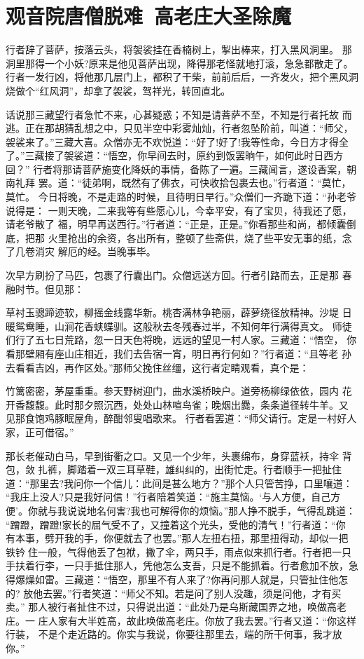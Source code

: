 \chapter{观音院唐僧脱难~高老庄大圣除魔}

行者辞了菩萨，按落云头，将袈裟挂在香楠树上，掣出棒来，打入黑风洞里。
那洞里那得一个小妖?原来是他见菩萨出现，降得那老怪就地打滚，急急都散走了。
行者一发行凶，将他那几层门上，都积了干柴，前前后后，一齐发火，把个黑风洞
烧做个“红风洞”，却拿了袈裟，驾祥光，转回直北。

话说那三藏望行者急忙不来，心甚疑惑；不知是请菩萨不至，不知是行者托故
而逃。正在那胡猜乱想之中，只见半空中彩雾灿灿，行者忽坠阶前，叫道：“师父，
袈裟来了。”三藏大喜。众僧亦无不欢悦道：“好了!好了!我等性命，今日方才得全
了。”三藏接了袈裟道：“悟空，你早间去时，原约到饭罢晌午，如何此时日西方回？”
行者将那请菩萨施变化降妖的事情，备陈了一遍。三藏闻言，遂设香案，朝南礼拜
罢。道：“徒弟啊，既然有了佛衣，可快收拾包裹去也。”行者道：“莫忙，莫忙。
今日将晚，不是走路的时候，且待明日早行。”众僧们一齐跪下道：“孙老爷说得是：
一则天晚，二来我等有些愿心儿，今幸平安，有了宝贝，待我还了愿，请老爷散了
福，明早再送西行。”行者道：“正是，正是。”你看那些和尚，都倾囊倒底，把那
火里抢出的余资，各出所有，整顿了些斋供，烧了些平安无事的纸，念了几卷消灾
解厄的经。当晚事毕。

次早方刷扮了马匹，包裹了行囊出门。众僧远送方回。行者引路而去，正是那
春融时节。但见那：

草衬玉骢蹄迹软，柳摇金线露华新。桃杏满林争艳丽，薜萝绕径放精神。沙堤
日暖鸳鸯睡，山涧花香蛱蝶驯。这般秋去冬残春过半，不知何年行满得真文。
师徒们行了五七日荒路，忽一日天色将晚，远远的望见一村人家。三藏道：“悟空，
你看那壁厢有座山庄相近，我们去告宿一宵，明日再行何如？”行者道：“且等老
孙去看看吉凶，再作区处。”那师父挽住丝缰，这行者定睛观看，真个是：

竹篱密密，茅屋重重。参天野树迎门，曲水溪桥映户。道旁杨柳绿依依，园内
花开香馥馥。此时那夕照沉西，处处山林喧鸟雀；晚烟出爨，条条道径转牛羊。又
见那食饱鸡豚眠屋角，醉酣邻叟唱歌来。
行者看罢道：“师父请行。定是一村好人家，正可借宿。”

那长老催动白马，早到街衢之口。又见一个少年，头裹绵布，身穿蓝袄，持伞
背包，敛扎裤，脚踏着一双三耳草鞋，雄纠纠的，出街忙走。行者顺手一把扯住
道：“那里去?我问你一个信儿：此间是甚么地方？”那个人只管苦挣，口里嚷道：
“我庄上没人?只是我好问信！”行者陪着笑道：“施主莫恼。‘与人方便，自己方
便’。你就与我说说地名何害?我也可解得你的烦恼。”那人挣不脱手，气得乱跳道：
“蹭蹬，蹭蹬!家长的屈气受不了，又撞着这个光头，受他的清气！”行者道：“你
有本事，劈开我的手，你便就去了也罢。”那人左扭右扭，那里扭得动，却似一把
铁钤住一般，气得他丢了包袱，撇了伞，两只手，雨点似来抓行者。行者把一只
手扶着行李，一只手抵住那人，凭他怎么支吾，只是不能抓着。行者愈加不放，急
得爆燥如雷。三藏道：“悟空，那里不有人来了?你再问那人就是，只管扯住他怎的?
放他去罢。”行者笑道：“师父不知。若是问了别人没趣，须是问他，才有买卖。”
那人被行者扯住不过，只得说出道：“此处乃是乌斯藏国界之地，唤做高老庄。一
庄人家有大半姓高，故此唤做高老庄。你放了我去罢。”行者又道：“你这样行装，
不是个走近路的。你实与我说，你要往那里去，端的所干何事，我才放你。”

